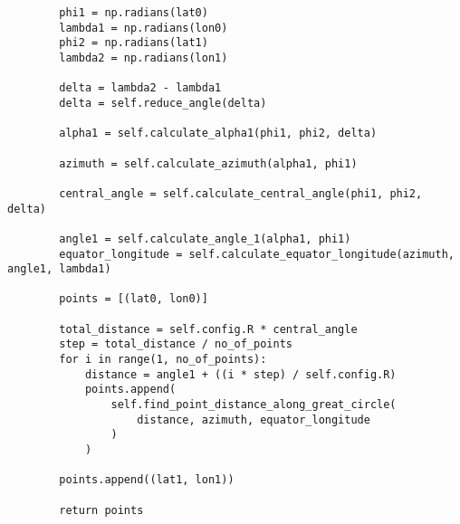 \begin{verbatim}
        phi1 = np.radians(lat0)
        lambda1 = np.radians(lon0)
        phi2 = np.radians(lat1)
        lambda2 = np.radians(lon1)

        delta = lambda2 - lambda1
        delta = self.reduce_angle(delta)

        alpha1 = self.calculate_alpha1(phi1, phi2, delta)

        azimuth = self.calculate_azimuth(alpha1, phi1)

        central_angle = self.calculate_central_angle(phi1, phi2, delta)

        angle1 = self.calculate_angle_1(alpha1, phi1)
        equator_longitude = self.calculate_equator_longitude(azimuth, angle1, lambda1)

        points = [(lat0, lon0)]

        total_distance = self.config.R * central_angle
        step = total_distance / no_of_points
        for i in range(1, no_of_points):
            distance = angle1 + ((i * step) / self.config.R)
            points.append(
                self.find_point_distance_along_great_circle(
                    distance, azimuth, equator_longitude
                )
            )

        points.append((lat1, lon1))

        return points

\end{verbatim}
